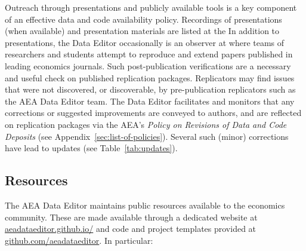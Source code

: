 Outreach through presentations and publicly available tools is a key component of an effective data and code availability policy. 
%
Recordings of  presentations (when available) and presentation materials are listed at the  In addition to presentations, the Data Editor occasionally is an observer at  where teams of researchers and students attempt to reproduce and extend papers published in leading economics journals. Such post-publication verifications are a necessary and useful check on published replication packages. Replicators may find issues that were not discovered, or discoverable, by pre-publication replicators such as the AEA Data Editor team. The Data Editor facilitates and monitors that any corrections or suggested improvements are conveyed to authors, and are reflected on replication packages via the AEA's \textit{Policy on Revisions of Data and Code Deposits} (see Appendix~\ref{sec:list-of-policies}). Several such (minor) corrections have lead to updates (see Table~\ref{tab:updates}). 
%


\subsection{Resources}

The AEA Data Editor maintains public resources available to the economics community. These are made available through a dedicated website at \href{https://aeadataeditor.github.io/}{aeadataeditor.github.io/} and code and project templates provided at \href{https://github.com/aeadataeditor}{github.com/aeadataeditor}. In particular:

